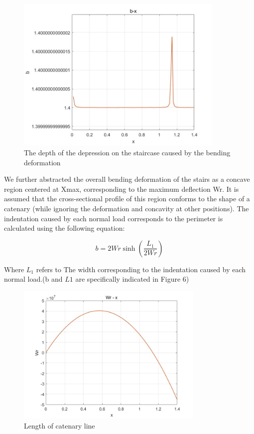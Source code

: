 \documentclass{mcmthesis}
\begin{document}
\begin{figure}[h]  %
  \small
  \centering  %
  \includegraphics[width=10cm]{7-The depth of the depression on the staircase caused by the bending deformation.jpg}
  \caption{The depth of the depression on the staircase caused by the bending deformation} \label{fig:2}  %
  \end{figure}  %








We further abstracted the overall bending deformation of the stairs as a concave region centered at Xmax, corresponding to the maximum deflection Wr. It is assumed that the cross-sectional profile of this region conforms to the shape of a catenary (while ignoring the deformation and concavity at other positions). The indentation caused by each normal load corresponds to the perimeter is calculated using the following equation:

\[ b = 2Wr \sinh\left(\frac{L_1}{2Wr}\right) \]

Where $L_1$ refers to The width corresponding to the indentation caused by each normal load.(b and $L1$ are specifically indicated in Figure 6)


\begin{figure}[h]  %
  \small
  \centering  %
  \includegraphics[width=9cm]{8-Length of catenary line-x.jpg}
  \caption{Length of catenary line} \label{fig:2}  %
  \end{figure}  %
\end{document}
